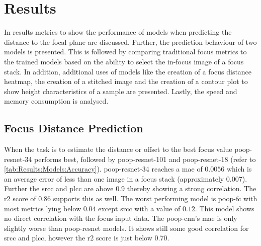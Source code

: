 \chapter{Results}
\label{ch:Results}

In results metrics to show the performance of models when predicting the distance to the focal plane are discussed. Further, the prediction behaviour of two models is presented. This is followed by comparing traditional focus metrics to the trained models based on the ability to select the in-focus image of a focus stack. In addition, additional uses of models like the creation of a focus distance heatmap, the creation of a stitched image and the creation of a contour plot to show height characteristics of a sample are presented. Lastly, the speed and memory consumption is analysed.


\section{Focus Distance Prediction}
\label{sec:Results:FocusDistance}

When the task is to estimate the distance or offset to the best focus value \acs{poop}-\acs{resnet}-34 performs best, followed by \acs{poop}-\acs{resnet}-101 and \acs{poop}-\acs{resnet}-18 (refer to \autoref{tab:Results:Models:Accuracy}). \Acs{poop}-\acs{resnet}-34 reaches a \ac{mae} of $0.0056$ which is an average error of less than one image in a focus stack (approximately $0.007$). Further the \ac{srcc} and \ac{plcc} are above $0.9$ thereby showing a strong correlation. The \ac{r2} score of $0.86$ supports this as well.
The worst performing model is \acs{poop}-\acs{fc} with most metrics lying below $0.04$ except \ac{srcc} with a value of $0.12$. This model shows no direct correlation with the focus input data. The \acs{poop}-\acs{cnn}'s \ac{mae} is only slightly worse than \acs{poop}-\acs{resnet} models. It shows still some good correlation for \ac{srcc} and \ac{plcc}, however the \ac{r2} score is just below $0.70$. 

